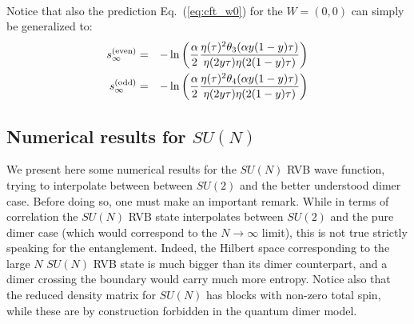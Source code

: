 \documentclass[11pt]{iopart}
\begin{document}
\paragraph{}
Notice that also the prediction Eq.~(\ref{eq:cft_w0}) for the $W=(0,0)$ can simply be generalized to:
\begin{eqnarray}\label{eq:cft_w0_gen}
 s_\infty^{\rm (even)}&=&-\ln \left(\frac{\alpha}{2}\frac{\eta(\tau)^2\theta_3(\alpha y(1-y)\tau)}{\eta(2y\tau)\eta(2(1-y)\tau)}\right)\\\label{eq:cft_w0_gen2}
 s_\infty^{\rm (odd )}&=&-\ln \left(\frac{\alpha}{2}\frac{\eta(\tau)^2\theta_4(\alpha y(1-y)\tau)}{\eta(2y\tau)\eta(2(1-y)\tau)}\right)
\end{eqnarray}

\subsection{Numerical results for $SU(N)$}
\label{sec:sun_numerics}
We present here some numerical results for the $SU(N)$ RVB wave function, trying to interpolate between between $SU(2)$ and the better understood dimer case. Before doing so, one must make an important remark. While in terms of correlation the $SU(N)$ RVB state interpolates between $SU(2)$ and the pure dimer case (which would correspond to the $N\to \infty$ limit), this is not true strictly speaking for the entanglement. Indeed, the Hilbert space corresponding to the large $N$ $SU(N)$ RVB state is much bigger than its dimer counterpart, and a dimer crossing the boundary would carry much more entropy. Notice also that the reduced density matrix for $SU(N)$ has blocks with non-zero total spin, while these are by construction forbidden in the quantum dimer model. 
\end{document}
